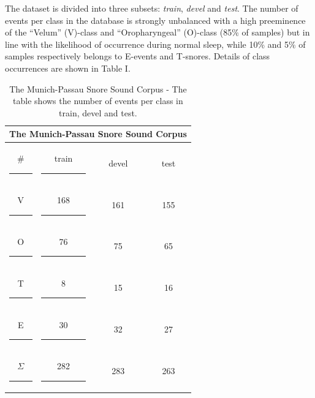The dataset is divided into three subsets: \textit{train}, \textit{devel} and \textit{test}.
The number of events per class in the database is strongly unbalanced with a high preeminence of the ``Velum'' (V)-class  and ``Oropharyngeal'' (O)-class (85\% of samples) but in line with the likelihood of occurrence during normal sleep, while 10\% and 5\% of samples respectively belongs to E-events and T-snores. Details of class occurrences are shown in Table I.

\begin{table}[t]
	\centering
	\begin{tabular}{cccc}
		\toprule
		\multicolumn{4}{c}{\textbf{The Munich-Passau Snore Sound Corpus}} \\
		\midrule
		\#  \rule{10pt}{0pt}	& train  \rule{10pt}{0pt} & devel & test\\
		\midrule
		V \rule{10pt}{0pt}	& 168  \rule{15pt}{0pt} & 161 & 155\\
		O \rule{10pt}{0pt}	& 76  \rule{15pt}{0pt} & 75 & 65\\
		T \rule{10pt}{0pt}	& 8  \rule{15pt}{0pt} & 15 & 16\\
		E \rule{10pt}{0pt}	& 30  \rule{15pt}{0pt}& 32 & 27\\
		\bottomrule
		$\Sigma$  \rule{10pt}{0pt} & 282  \rule{13pt}{0pt} & 283 & 263\\
	\end{tabular}
	\caption[The Munich-Passau Snore Sound Corpus]{The Munich-Passau Snore Sound Corpus - The table shows the number of events per class in train, devel and test.}
	\label{tab:mpssc} 
\end{table}



